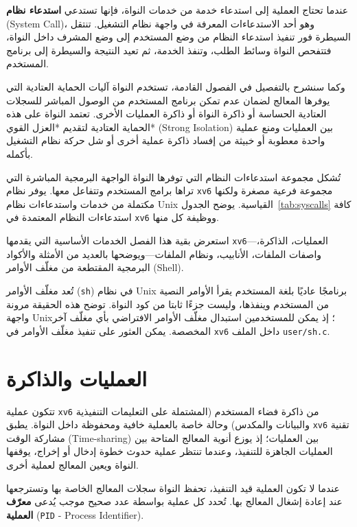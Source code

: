 عندما تحتاج العملية إلى استدعاء خدمة من خدمات النواة، فإنها تستدعي \textbf{استدعاء نظام} (System Call)،
وهو أحد الاستدعاءات المعرفة في واجهة نظام التشغيل.
تنتقل السيطرة فور تنفيذ استدعاء النظام من وضع المستخدم إلى وضع المشرف داخل النواة،
فتتفحص النواة وسائط الطلب، وتنفذ الخدمة، ثم تعيد النتيجة والسيطرة إلى برنامج المستخدم.

وكما سنشرح بالتفصيل في الفصول القادمة، تستخدم النواة آليات الحماية العتادية التي يوفرها المعالج
لضمان عدم تمكن برنامج المستخدم من الوصول المباشر للسجلات العتادية الحساسة أو ذاكرة النواة أو ذاكرة العمليات الأخرى.
تعتمد النواة على هذه الحماية العتادية لتقديم *العزل القوي* (Strong Isolation) بين العمليات
ومنع عملية واحدة معطوبة أو خبيثة من إفساد ذاكرة عملية أخرى أو شل حركة نظام التشغيل بأكمله.

تُشكل مجموعة استدعاءات النظام التي توفرها النواة الواجهة البرمجية المباشرة التي تراها برامج المستخدم وتتفاعل معها.
يوفر نظام \texttt{xv6} مجموعة فرعية مصغرة ولكنها مكتملة من خدمات واستدعاءات نظام Unix القياسية.
يوضح الجدول~\ref{tab:syscalls} كافة استدعاءات النظام المعتمدة في \texttt{xv6} ووظيفة كل منها.

استعرض بقية هذا الفصل الخدمات الأساسية التي يقدمها \texttt{xv6}---العمليات، الذاكرة، واصفات الملفات، الأنابيب، ونظام الملفات---ويوضحها بالعديد من الأمثلة والأكواد البرمجية المقتطعة من مغلّف الأوامر (Shell).

تُعد مغلّف الأوامر (\texttt{sh}) في نظام Unix برنامجًا عاديًا بلغة المستخدم يقرأ الأوامر النصية من المستخدم وينفذها، وليست جزءًا ثابتا من كود النواة. توضح هذه الحقيقة مرونة واجهة Unix؛ إذ يمكن للمستخدمين استبدال مغلّف الأوامر الافتراضي بأي مغلّف آخر المخصصة. يمكن العثور على تنفيذ مغلّف الأوامر في \texttt{xv6} داخل الملف \texttt{user/sh.c}.

\section{العمليات والذاكرة}
\label{sec:process_memory}

تتكون عملية \texttt{xv6} من ذاكرة فضاء المستخدم (المشتملة على التعليمات التنفيذية والبيانات والمكدس) وحالة خاصة بالعملية خافية ومحفوظة داخل النواة. يطبق \texttt{xv6} تقنية مشاركة الوقت (Time-sharing) بين العمليات؛ إذ يوزع أنوية المعالج المتاحة بين العمليات الجاهزة للتنفيذ، وعندما تنتظر عملية حدوث خطوة إدخال أو إخراج، يوقفها النواة ويعين المعالج لعملية أخرى.

عندما لا تكون العملية قيد التنفيذ، تحفظ النواة سجلات المعالج الخاصة بها وتسترجعها عند إعادة إشغال المعالج بها. تُحدد كل عملية بواسطة عدد صحيح موجب يُدعى \textbf{معرّف العملية} (\texttt{PID} - Process Identifier).

